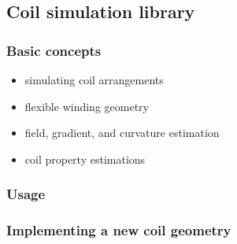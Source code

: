 \begin{frame}
    \section{Coil simulation library}
\end{frame}

\begin{frame}
    \frametitle{Basic concepts}
    \begin{itemize}
        \item simulating coil arrangements
        \item flexible winding geometry
        \item field, gradient, and curvature estimation
        \item coil property estimations
    \end{itemize}
\end{frame}

\begin{frame}
    \frametitle{Usage}
\end{frame}

\begin{frame}
    \frametitle{Implementing a new coil geometry}
\end{frame}

